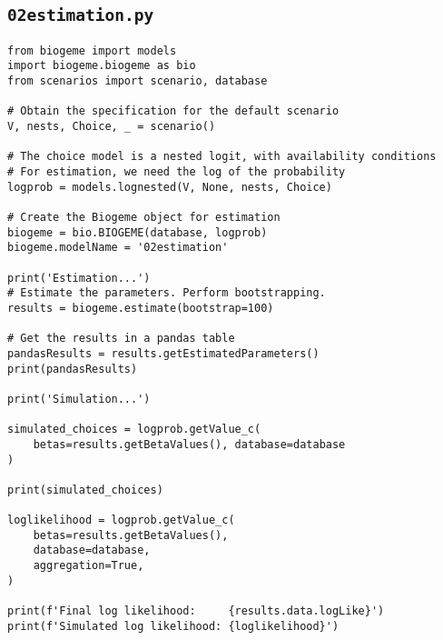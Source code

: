\documentclass[12pt,a4paper]{article}
\begin{document}
\subsection{\lstinline$02estimation.py$}\label{sec:02estimation}
\begin{lstlisting}[style=numbers]
from biogeme import models
import biogeme.biogeme as bio
from scenarios import scenario, database

# Obtain the specification for the default scenario
V, nests, Choice, _ = scenario()

# The choice model is a nested logit, with availability conditions
# For estimation, we need the log of the probability
logprob = models.lognested(V, None, nests, Choice)

# Create the Biogeme object for estimation
biogeme = bio.BIOGEME(database, logprob)
biogeme.modelName = '02estimation'

print('Estimation...')
# Estimate the parameters. Perform bootstrapping.
results = biogeme.estimate(bootstrap=100)

# Get the results in a pandas table
pandasResults = results.getEstimatedParameters()
print(pandasResults)

print('Simulation...')

simulated_choices = logprob.getValue_c(
    betas=results.getBetaValues(), database=database
)

print(simulated_choices)

loglikelihood = logprob.getValue_c(
    betas=results.getBetaValues(),
    database=database,
    aggregation=True,
)

print(f'Final log likelihood:     {results.data.logLike}')
print(f'Simulated log likelihood: {loglikelihood}')
\end{lstlisting}
\end{document}
